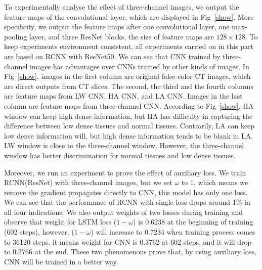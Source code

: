 \documentclass[journal]{IEEEtran}
\begin{document}
To experimentally analyse the effect of three-channel images, we output the feature maps of the convolutional layer, which are displayed in Fig~\ref{show}. More specificity, we output the feature maps after one convolutional layer, one max-pooling layer, and three ResNet blocks, the size of feature maps are $128 \times 128$. To keep experiments environment consistent, all experiments carried on in this part are based on RCNN with ResNet50. We can see that CNN trained by three-channel images has advantages over CNNs trained by other kinds of images. 
In Fig~\ref{show}, images in the first column are original false-color CT images, which are direct outputs from CT slices. The second, the third and the fourth columns are feature maps from LW CNN, HA CNN, and LA CNN. Images in the last column are feature maps from three-channel CNN. 
According to Fig~\ref{show}, HA window can keep high dense information, but HA has difficulty in capturing the difference between low dense tissues and normal tissues. Contrarily, LA can keep low dense information will, but high dense information tends to be blank in LA. LW window is close to the three-channel window. However, the three-channel window has better discrimination for normal tissues and low dense tissues.

Moreover, we run an experiment to prove the effect of auxiliary loss. We train RCNN(ResNet) with three-channel images, but we set $\omega$ to $1$, which means we remove the gradient propagates directly to CNN, this model has only one loss. We can see that the performance of RCNN with single loss drops around 1\% in all four indications. We also output weights of two losses during training and observe that weight for LSTM loss ($1 - \omega$) is 0.6238 at the beginning of training (602 steps), however, ($1 - \omega$) will increase to 0.7234 when training process comes to 36120 steps, it means weight for CNN is 0.3762 at 602 steps, and it will drop to 0.2766 at the end. These two phenomenons prove that, by using auxiliary loss, CNN will be trained in a better way. 
\end{document}
